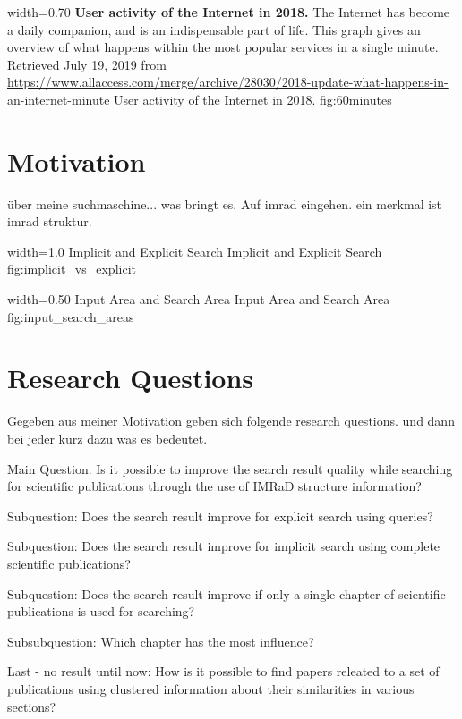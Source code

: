       {width=0.70\textwidth}
      {\textbf{User activity of the Internet in 2018.} The Internet has become a daily companion, and is an indispensable part of life. This graph gives an overview of what happens within the most popular services in a single minute. Retrieved July 19, 2019 from \url{https://www.allaccess.com/merge/archive/28030/2018-update-what-happens-in-an-internet-minute}}
      {User activity of the Internet in 2018.}
      {fig:60minutes}

\section{Motivation}
\label{sec:Motivation}

über meine suchmaschine... was bringt es. Auf imrad eingehen. ein merkmal ist imrad struktur.

      {width=1.0\textwidth}
      {Implicit and Explicit Search}
      {Implicit and Explicit Search}
      {fig:implicit_vs_explicit}

      {width=0.50\textwidth}
      {Input Area and Search Area}
      {Input Area and Search Area}
      {fig:input_search_areas}


\section{Research Questions}
\label{sec:research_questions}

Gegeben aus meiner Motivation geben sich folgende research questions. und dann bei jeder kurz dazu was es bedeutet.


Main Question: Is it possible to improve the search result quality while searching for scientific publications through the use of IMRaD structure information?

Subquestion: Does the search result improve for explicit search using queries?

Subquestion: Does the search result improve for implicit search using complete scientific publications?

Subquestion: Does the search result improve if only a single chapter of scientific publications is used for searching?

Subsubquestion: Which chapter has the most influence?

Last - no result until now: How is it possible to find papers releated to a set of publications using clustered information about their similarities in various sections?
